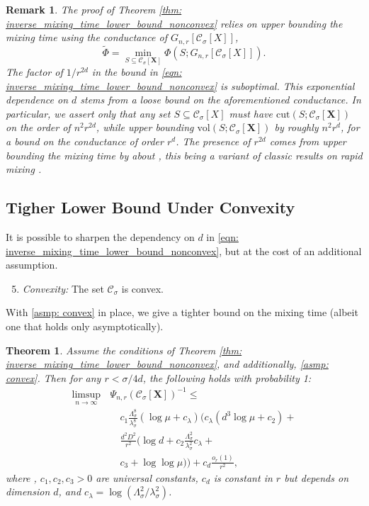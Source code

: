\documentclass{article}
\newcommand{\vol}{\mathrm{vol}}
\newcommand{\cut}{\mathrm{cut}}
\newcommand{\1}{\mathbf{1}}
\newcommand{\Xbf}{\mathbf{X}}
\newcommand{\Cset}{\mathcal{C}}
\newcommand{\Csig}{\Cset_{\sigma}}
\theoremstyle{aldenthm}
\newtheorem{theorem}{Theorem}
\theoremstyle{aldenrmrk}
\newtheorem{remark}{Remark}
\begin{document}
\begin{remark}
The proof of Theorem \ref{thm: inverse_mixing_time_lower_bound_nonconvex} relies
on upper bounding the mixing time using the \emph{conductance} of $G_{n,r}[\Csig[X]]$, 
$$
\widetilde{\Phi} = \min_{S \subseteq \Csig[\Xbf]} \Phi(S; G_{n,r}[\Csig[X]]).
$$
The factor of $1/r^{2d}$ in the bound in \eqref{eqn:
  inverse_mixing_time_lower_bound_nonconvex} is suboptimal. This exponential 
dependence on $d$ stems from a loose bound on the aforementioned
conductance. In particular, we assert only that any set $S \subseteq \Csig[X]$
must have $\cut(S; \Csig[\Xbf])$ on the order of $n^2 r^{2d}$, while upper bounding
$\vol(S; \Csig[\Xbf])$ by roughly $n^2 r^d$, for a bound on the conductance of
order $r^d$. The presence of $r^{2d}$ comes from upper bounding the mixing time
by about , this being a variant of classic results
on rapid mixing \citep{jerrum89}.  
\end{remark}

\subsection{Tigher Lower Bound Under Convexity}

It is possible to sharpen the dependency on $d$ in 
\eqref{eqn: inverse_mixing_time_lower_bound_nonconvex}, but at the cost of an  
additional assumption.
\begin{enumerate}[label=(A\arabic*)]
\setcounter{enumi}{4}
\item 
\label{asmp: convex}
\emph{Convexity:} The set $\Cset_\sigma$ is convex. 
\end{enumerate}

With \ref{asmp: convex} in place, we give a tighter bound on the
mixing time (albeit one that holds only asymptotically).   

\begin{theorem}
\label{thm: inverse_mixing_time_lower_bound}
Assume the conditions of Theorem \ref{thm:
  inverse_mixing_time_lower_bound_nonconvex}, and additionally, \ref{asmp:
  convex}. Then for any $r < \sigma/4d$, the following holds with probability 1:  
\begin{align}
\label{eqn: inverse_mixing_time_lower_bound}
  \limsup_{n \to \infty} \, &\Psi_{n,r}(\Csig[\Xbf])^{-1} \leq \nonumber \\ 
&\quad c_1 \frac{\Lambda_{\sigma}^8}{\lambda_{\sigma}^8} (\log \mu +
  c_{\lambda}) \biggl( c_{\lambda}(d^3 \log\mu + c_2) +{} \nonumber \\  
&\quad \frac{d^2D^2}{r^2} \bigl( \log d + c_2
  \frac{\Lambda_{\sigma}^{2}}{\lambda_{\sigma}^{2}}c_{\lambda} +{} \nonumber \\  
&\quad c_3  + \log \log \mu \bigr) \biggr) + c_d \frac{o_r(1)}{r^2},
\end{align}
where , $c_1,c_2,c_3>0$ are universal
constants, $c_d$ is constant in $r$ but depends on dimension $d$, and
$c_{\lambda} = \log(\Lambda_{\sigma}^2/ \lambda_{\sigma}^2)$.  
\end{theorem}
\end{document}
